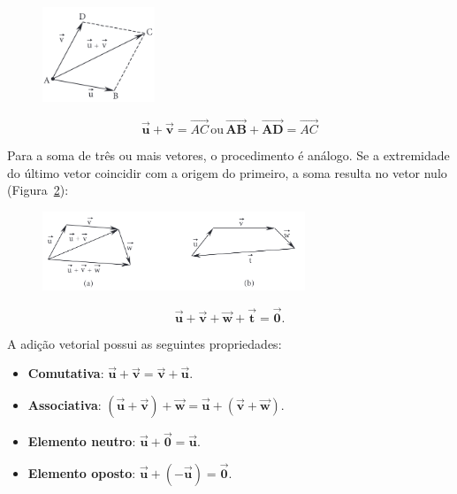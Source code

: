 \begin{figure}[H]
    \centering
    \includegraphics[width=0.3\textwidth]{./fig/fig1.16.png}
    \caption{}\label{fig:fig1.16}
\end{figure}

\[
  \mathbf{\overrightarrow{u}} + \mathbf{\overrightarrow{v}} = \overrightarrow{AC}
  \, \text{ou} \,
  \mathbf{\overrightarrow{AB}} + \mathbf{\overrightarrow{AD}} = \overrightarrow{AC}
\]

Para a soma de três ou mais vetores, o procedimento é análogo. Se a extremidade
do último vetor coincidir com a origem do primeiro, a soma resulta no vetor
  nulo (Figura~\ref{fig:fig1.17}):

\begin{figure}[H]
    \centering
    \includegraphics[width=0.7\textwidth]{./fig/fig1.17.png}
    \caption{}\label{fig:fig1.17}
\end{figure}

\[
\mathbf{\overrightarrow{u}} + \mathbf{\overrightarrow{v}} +
\mathbf{\overrightarrow{w}} + \mathbf{\overrightarrow{t}} =
\mathbf{\overrightarrow{0}}.
\]

A adição vetorial possui as seguintes propriedades:

\begin{itemize}
    \item \textbf{Comutativa}: $\mathbf{\overrightarrow{u}} +
      \mathbf{\overrightarrow{v}} = \mathbf{\overrightarrow{v}} +
      \mathbf{\overrightarrow{u}}$.
    \item \textbf{Associativa}: $(\mathbf{\overrightarrow{u}} +
      \mathbf{\overrightarrow{v}}) + \mathbf{\overrightarrow{w}} =
      \mathbf{\overrightarrow{u}} + (\mathbf{\overrightarrow{v}} +
      \mathbf{\overrightarrow{w}})$.
    \item \textbf{Elemento neutro}: $\mathbf{\overrightarrow{u}} +
      \mathbf{\overrightarrow{0}} = \mathbf{\overrightarrow{u}}$.
    \item \textbf{Elemento oposto}: $\mathbf{\overrightarrow{u}} +
      (-\mathbf{\overrightarrow{u}}) = \mathbf{\overrightarrow{0}}$.
\end{itemize}

